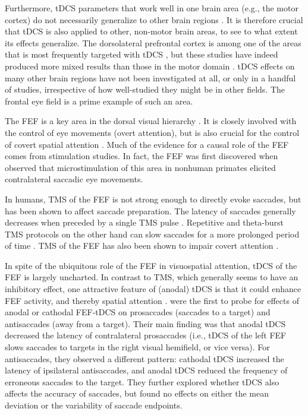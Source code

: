 \documentclass[11pt,english,]{memoir}
\begin{document}
Furthermore, tDCS parameters that work well in one brain area (e.g., the motor cortex) do not necessarily generalize to other brain regions \autocites{Parkin2015}{Bestmann2017}. It is therefore crucial that tDCS is also applied to other, non-motor brain areas, to see to what extent its effects generalize. The dorsolateral prefrontal cortex is among one of the areas that is most frequently targeted with tDCS \autocite{Santarnecchi2015}, but these studies have indeed produced more mixed results than those in the motor domain \autocite{Tremblay2014a}. tDCS effects on many other brain regions have not been investigated at all, or only in a handful of studies, irrespective of how well-studied they might be in other fields. The frontal eye field is a prime example of such an area.

The FEF is a key area in the dorsal visual hierarchy \autocites{Schall2009}{Corbetta2002}. It is closely involved with the control of eye movements (overt attention), but is also crucial for the control of covert spatial attention \autocites{Nobre2000}{Grosbras2005}. Much of the evidence for a causal role of the FEF comes from stimulation studies. In fact, the FEF was first discovered when \textcite{Ferrier1873} observed that microstimulation of this area in nonhuman primates elicited contralateral saccadic eye movements.

In humans, TMS of the FEF is not strong enough to directly evoke saccades, but has been shown to affect saccade preparation. The latency of saccades generally decreases when preceded by a single TMS pulse \autocites{Thickbroom1996}{Ro2002}{Juan2008}. Repetitive and theta-burst TMS protocols on the other hand can slow saccades for a more prolonged period of time \autocite{Nyffeler2006}. TMS of the FEF has also been shown to impair covert attention \autocite{Capotosto2009}.

In spite of the ubiquitous role of the FEF in visuospatial attention, tDCS of the FEF is largely uncharted. In contrast to TMS, which generally seems to have an inhibitory effect, one attractive feature of (anodal) tDCS is that it could enhance FEF activity, and thereby spatial attention \autocite{Reteig2017}. \textcite{Kanai2012} were the first to probe for effects of anodal or cathodal FEF-tDCS on prosaccades (saccades to a target) and antisaccades (away from a target). Their main finding was that anodal tDCS decreased the latency of contralateral prosaccades (i.e., tDCS of the left FEF slows saccades to targets in the right visual hemifield, or vice versa). For antisaccades, they observed a different pattern: cathodal tDCS increased the latency of ipsilateral antisaccades, and anodal tDCS reduced the frequency of erroneous saccades to the target. They further explored whether tDCS also affects the accuracy of saccades, but found no effects on either the mean deviation or the variability of saccade endpoints.
\end{document}
